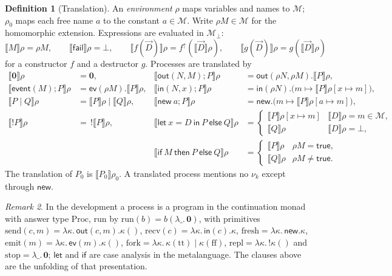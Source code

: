\documentclass[11pt]{article}
\theoremstyle{definition}
\newtheorem{definition}{Definition}[section]
\theoremstyle{plain}
\theoremstyle{remark}
\newtheorem{remark}[definition]{Remark}
\newcommand{\Msg}{\mathcal{M}}
\newcommand{\Msgf}{\Msg_{\bot}}
\newcommand{\Proc}{\mathrm{Proc}}
\newcommand{\aout}{\mathsf{out}}
\newcommand{\ain}{\mathsf{in}}
\newcommand{\anew}{\mathsf{new}}
\newcommand{\aev}{\mathsf{ev}}
\newcommand{\sem}[1]{\llbracket #1 \rrbracket}
\newcommand{\pv}[1]{\mathsf{#1}}
\newcommand{\fail}{\pv{fail}}
\newcommand{\true}{\pv{true}}
\begin{document}
\begin{definition}[Translation]
An \emph{environment} $\rho$ maps variables and names to $\Msg$; $\rho_0$ maps each free name $a$ to the constant $a\in\Msg$. Write $\rho M\in\Msg$ for the homomorphic extension. Expressions are evaluated in $\Msgf$:
\[
\sem{M}\rho=\rho M,\qquad \sem{\fail}\rho=\bot,\qquad
\sem{f(\vec D)}\rho=f^{\uparrow}(\sem{\vec D}\rho),\qquad
\sem{g(\vec D)}\rho=g(\sem{\vec D}\rho)
\]
for a constructor $f$ and a destructor $g$. Processes are translated by
\begin{align*}
\sem{\mathbf{0}}\rho&=\mathbf{0},&
\sem{\pv{out}(N,M);P}\rho&=\aout(\rho N,\rho M).\sem{P}\rho,\\
\sem{\pv{event}(M);P}\rho&=\aev(\rho M).\sem{P}\rho,&
\sem{\pv{in}(N,x);P}\rho&=\ain(\rho N).\big(m\mapsto\sem{P}\rho[x\mapsto m]\big),\\
\sem{P\mid Q}\rho&=\sem{P}\rho\mid\sem{Q}\rho,&
\sem{\pv{new}\ a;P}\rho&=\anew.\big(m\mapsto\sem{P}\rho[a\mapsto m]\big),\\
\sem{!P}\rho&=\,!\sem{P}\rho,&
\sem{\pv{let}\ x=D\ \pv{in}\ P\ \pv{else}\ Q}\rho&=
\begin{cases}\sem{P}\rho[x\mapsto m]&\sem{D}\rho=m\in\Msg,\\ \sem{Q}\rho&\sem{D}\rho=\bot,\end{cases}\\
&&\sem{\pv{if}\ M\ \pv{then}\ P\ \pv{else}\ Q}\rho&=
\begin{cases}\sem{P}\rho&\rho M=\true,\\ \sem{Q}\rho&\rho M\ne\true.\end{cases}
\end{align*}
The translation of $P_0$ is $\sem{P_0}\rho_0$. A translated process mentions no $\nu_k$ except through $\anew$.
\end{definition}

\begin{remark}
In the development a process is a program in the continuation monad with answer type $\Proc$, run by $\mathrm{run}(b)=b(\lambda\_.\,\mathbf{0})$, with primitives $\mathrm{send}(c,m)=\lambda\kappa.\,\aout(c,m).\kappa()$, $\mathrm{recv}(c)=\lambda\kappa.\,\ain(c).\kappa$, $\mathrm{fresh}=\lambda\kappa.\,\anew.\kappa$, $\mathrm{emit}(m)=\lambda\kappa.\,\aev(m).\kappa()$, $\mathrm{fork}=\lambda\kappa.\,\kappa(\mathrm{tt})\mid\kappa(\mathrm{ff})$, $\mathrm{repl}=\lambda\kappa.\,!\kappa()$ and $\mathrm{stop}=\lambda\_.\,\mathbf{0}$; $\pv{let}$ and $\pv{if}$ are case analysis in the metalanguage. The clauses above are the unfolding of that presentation.
\end{remark}
\end{document}
